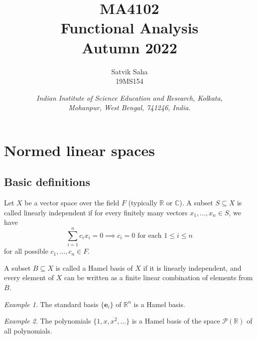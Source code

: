 \documentclass[11pt]{article}
\title{
    \Large\textsc{MA4102} \\
    \Huge \textbf{Functional Analysis} \\
    \vspace{5pt}
    \Large{Autumn 2022}
}
\author{
    \large Satvik Saha
    \\\textsc{\small 19MS154}
}
\date{\normalsize
    \textit{Indian Institute of Science Education and Research, Kolkata, \\
    Mohanpur, West Bengal, 741246, India.} \\
}
\newcommand{\C}{\mathbb{C}}
\newcommand{\R}{\mathbb{R}}
\theoremstyle{definition}
\theoremstyle{remark}
\newtheorem*{example}{Example}
\begin{document}
    \maketitle

    \tableofcontents
    \setlength{\parskip}{1em}


    \section{Normed linear spaces}

    \subsection{Basic definitions}

    \begin{definition}
        Let $X$ be a vector space over the field $F$ (typically $\R$ or $\C$). A
        subset $S \subseteq X$ is called linearly independent if for every finitely
        many vectors $x_1, \dots, x_n \in S$, we have \[
            \sum_{i = 1}^n c_ix_i = 0 \implies c_i = 0 \text{ for each } 1 \leq i \leq
            n
        \] for all possible $c_1, \dots, c_n \in F$.
    \end{definition}

    \begin{definition}
        A subset $B \subseteq X$ is called a Hamel basis of $X$ if it is linearly
        independent, and every element of $X$ can be written as a finite linear
        combination of elements from $B$.
    \end{definition}
    \begin{example}
        The standard basis $\{\bm{e}_i\}$ of $\R^n$ is a Hamel basis.
    \end{example}
    \begin{example}
        The polynomials $\{1, x, x^2, \dots\}$ is a Hamel basis of the space
        $\mathscr{P}(\R)$ of all polynomials.
    \end{example}
\end{document}
